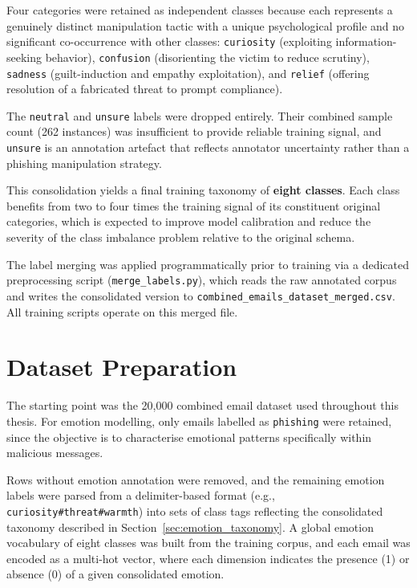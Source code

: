 Four categories were retained as independent classes because each represents a genuinely distinct manipulation tactic with a unique psychological profile and no significant co-occurrence with other classes: \texttt{curiosity} (exploiting information-seeking behavior), \texttt{confusion} (disorienting the victim to reduce scrutiny), \texttt{sadness} (guilt-induction and empathy exploitation), and \texttt{relief} (offering resolution of a fabricated threat to prompt compliance).

The \texttt{neutral} and \texttt{unsure} labels were dropped entirely. Their combined sample count (262 instances) was insufficient to provide reliable training signal, and \texttt{unsure} is an annotation artefact that reflects annotator uncertainty rather than a phishing manipulation strategy.

This consolidation yields a final training taxonomy of \textbf{eight classes}. Each class benefits from two to four times the training signal of its constituent original categories, which is expected to improve model calibration and reduce the severity of the class imbalance problem relative to the original schema.

The label merging was applied programmatically prior to training via a dedicated preprocessing script (\texttt{merge\_labels.py}), which reads the raw annotated corpus and writes the consolidated version to \texttt{combined\_emails\_dataset\_merged.csv}. All training scripts operate on this merged file.

\section{Dataset Preparation}
The starting point was the 20,000 combined email dataset used throughout this thesis. For emotion modelling, only emails labelled as \texttt{phishing} were retained, since the objective is to characterise emotional patterns specifically within malicious messages.

Rows without emotion annotation were removed, and the remaining emotion labels were parsed from a delimiter-based format (e.g., \texttt{curiosity\#threat\#warmth}) into sets of class tags reflecting the consolidated taxonomy described in Section~\ref{sec:emotion_taxonomy}. A global emotion vocabulary of eight classes was built from the training corpus, and each email was encoded as a multi-hot vector, where each dimension indicates the presence (1) or absence (0) of a given consolidated emotion.

